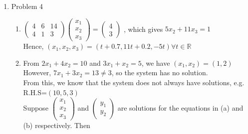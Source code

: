 \documentclass[leqno,12pt]{article}
\def\RR{\mathbb{R}}
\begin{document}
\begin{enumerate}
\item Problem 4
\begin{enumerate}
\item $\begin{pmatrix}4&6&14\\4&1&3\end{pmatrix}\begin{pmatrix}x_1\\x_2\\x_3\end{pmatrix}
=\begin{pmatrix}4\\3\end{pmatrix}$
, which gives $5x_2+11x_3=1$\\
Hence, $(x_1, x_2, x_3)=(t+0.7, 11t+0.2, -5t)\forall t\in\RR$
\item From $2x_1+4x_2=10$ and $3x_1+x_2=5$, we have $(x_1,x_2)=(1,2)$\\
However, $7x_1+3x_2=13\neq 3$, so the system has no solution.\\
From this, we know that the system does not always have solutions, e.g. R.H.S=$(10,5,3)$\\
Suppose 
$\begin{pmatrix}x_1\\x_2\\x_3\end{pmatrix}$ and $\begin{pmatrix}y_1\\y_2\end{pmatrix}$ are solutions for the equations in (a) and (b) respectively. Then\\

\end{enumerate}
\end{enumerate}
\end{document}
